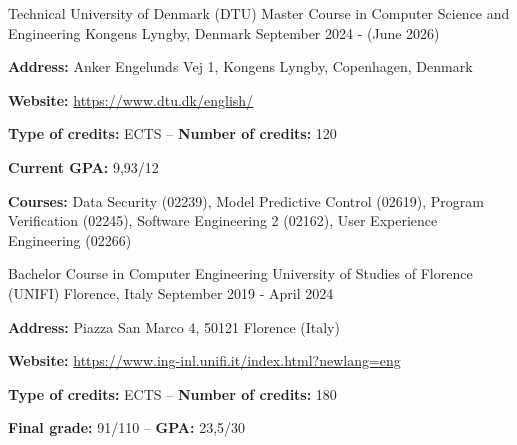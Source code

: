 

\begin{cventries}

  \cventry
    {Technical University of Denmark (DTU)} %
    {Master Course in Computer Science and Engineering} %
    {Kongens Lyngby, Denmark} %
    {September 2024 - (June 2026)} %
    {
      \begin{cvitems} %
        \item {\textbf{Address:} Anker Engelunds Vej 1, Kongens Lyngby, Copenhagen, Denmark}
        \item {\textbf{Website:} \href{https://www.dtu.dk/english/}{https://www.dtu.dk/english/}}
        \item {\textbf{Type of credits:} ECTS – \textbf{Number of credits:} 120}
        \item {\textbf{Current GPA:} 9,93/12}
        \item {\textbf{Courses:} Data Security (02239), Model Predictive Control (02619), Program Verification (02245), Software Engineering 2 (02162), User Experience Engineering (02266)}
      \end{cvitems}
    }

  \cventry
    {Bachelor Course in Computer Engineering} %
    {University of Studies of Florence (UNIFI)} %
    {Florence, Italy} %
    {September 2019 - April 2024} %
    {
      \begin{cvitems} %
        \item {\textbf{Address:} Piazza San Marco 4, 50121 Florence (Italy)}
        \item {\textbf{Website:} \href{https://www.ing-inl.unifi.it/index.html?newlang=eng}{https://www.ing-inl.unifi.it/index.html?newlang=eng}}
        \item {\textbf{Type of credits:} ECTS – \textbf{Number of credits:} 180}
        \item {\textbf{Final grade:} 91/110 – \textbf{GPA:} 23,5/30}
      \end{cvitems}
    }


\end{cventries}
